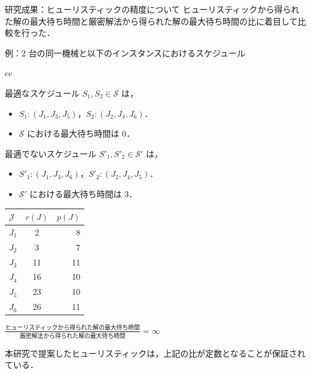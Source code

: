 \documentclass[dvipdfmx]{beamer}
\begin{document}
    \begin{frame}{研究成果：ヒューリスティックの精度について}
      ヒューリスティックから得られた解の最大待ち時間と厳密解法から得られた解の最大待ち時間の比に着目して比較を行った．
      \begin{exampleblock}{例：2 台の同一機械と以下のインスタンスにおけるスケジュール}
        \begin{tabular}{cc}
          \begin{minipage}[]{0.6\hsize}
            最適なスケジュール $S_1, S_2 \in \mathcal{S}$ は，
            \begin{itemize}
              \item $S_1:(J_1,J_3,J_5)$，$S_2:(J_2,J_4,J_6)$．
              \item $\mathcal{S}$ における最大待ち時間は $0$．
            \end{itemize}
            最適でないスケジュール $S'_1, S'_2 \in \mathcal{S'}$ は，
            \begin{itemize}
              \item $S'_1:(J_1,J_3,J_6)$，$S'_2:(J_2,J_4,J_5)$．
              \item $\mathcal{S'}$ における最大待ち時間は $3$．
            \end{itemize}
          \end{minipage}
          \begin{minipage}[c]{0.4\hsize}
            \begin{table}[htb]
              \begin{tabular}{|l|c|r|} \hline
                $\mathcal{J}$ & $r(J)$ & $p(J)$ \\ \hline \hline
                $J_1$ & 2 & 8 \\ \hline
                $J_2$ & 3 & 7 \\ \hline
                $J_3$ & 11 & 11 \\ \hline
                $J_4$ & 16 & 10 \\ \hline
                $J_5$ & 23 & 10 \\ \hline
                $J_6$ & 26 & 11 \\ \hline
              \end{tabular}
            \end{table}
          \end{minipage}
        \end{tabular}
        ${\displaystyle \frac{\text{ヒューリスティックから得られた解の最大待ち時間}}{\text{厳密解法から得られた解の最大待ち時間}} = \infty}$
      \end{exampleblock}
      本研究で提案したヒューリスティックは，上記の比が定数となることが保証されている．
    \end{frame}
\end{document}

